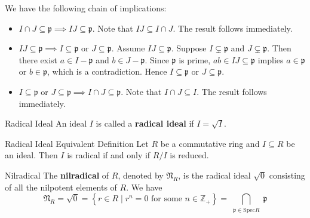 \begin{prf}
    We have the following chain of implications:
    \begin{itemize}
        \item $I\cap J\subseteq \mathfrak{p}\implies IJ\subseteq \mathfrak{p}$. Note that $IJ\subseteq I\cap J$. The result follows immediately.
        \item $IJ\subseteq \mathfrak{p}\implies I\subseteq \mathfrak{p}\text{ or }J\subseteq \mathfrak{p}$. Assume $IJ\subseteq \mathfrak{p}$. Suppose $I\subsetneq \mathfrak{p}$ and $J\subsetneq \mathfrak{p}$. Then there exist $a\in I-\mathfrak{p}$ and $b\in J-\mathfrak{p}$. Since $\mathfrak{p}$ is prime, $ab\in IJ\subseteq \mathfrak{p}$ implies $a\in \mathfrak{p}$ or $b\in \mathfrak{p}$, which is a contradiction. Hence $I\subseteq \mathfrak{p}$ or $J\subseteq \mathfrak{p}$.
        \item $I\subseteq \mathfrak{p}\text{ or }J\subseteq \mathfrak{p}\implies I\cap J\subseteq \mathfrak{p}$. Note that $I\cap J\subseteq I$. The result follows immediately.
    \end{itemize}
\end{prf}


\begin{definition}{Radical Ideal}{}
    An ideal $I$ is called a \textbf{radical ideal} if $I=\sqrt{I}$.
\end{definition}

\begin{proposition}{Radical Ideal Equivalent Definition}{}
    Let $R$ be a commutative ring and $I\subseteq R$ be an ideal. Then $I$ is radical if and only if $R/I$ is reduced.
\end{proposition}

\begin{definition}{Nilradical}{}
    The \textbf{nilradical} of $R$, denoted by $\mathfrak{N}_R$, is the radical ideal $\sqrt{0}$ consisting of all the nilpotent elements of $R$. We have
    \[
        \mathfrak{N}_R=\sqrt{0}=\left\{ r \in R \mid r^n=0 \text{ for some } n \in \mathbb{Z}_{+} \right\} = \bigcap_{\substack{\mathfrak{p} \in \mathrm{Spec} R }} \mathfrak{p}
            \]
\end{definition}



